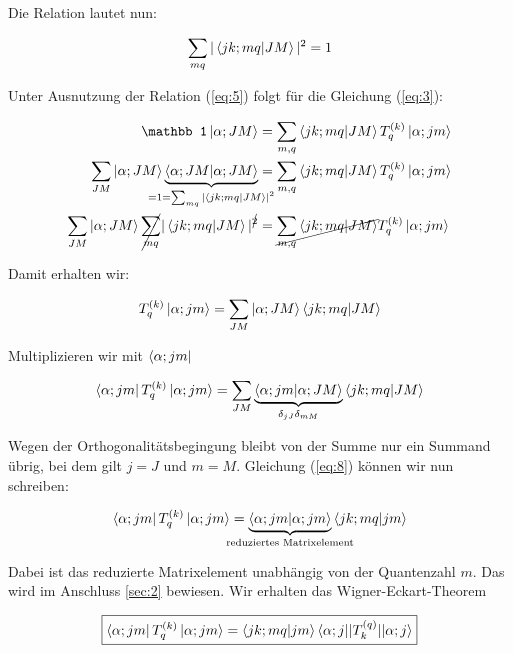 Die Relation lautet nun:

\begin{equation}
  \label{eq:5}
  \sum_{mq}|\braket{jk;mq}{JM} |^2 = 1
\end{equation}

Unter Ausnutzung der Relation (\ref{eq:5}) folgt für die Gleichung (\ref{eq:3}):

\begin{align}
  \label{eq:6}
   \mathbb 1 \ket{\alpha; JM} &=  \sum_{m,q} \braket{jk;mq}{JM} T^{(k)}_q  \ket{\alpha;jm} \\
 \sum_{JM} \ket{\alpha; JM}\underbr{\braket{\alpha; JM}{\alpha; JM}}_{=1=\sum_{mq}|\braket{jk;mq}{JM} |^2} &=  \sum_{m,q} \braket{jk;mq}{JM} T^{(k)}_q  \ket{\alpha;jm} \\
\sum_{JM}\ket{\alpha; JM} \cancel{\sum_{mq}}|\braket{jk;mq}{JM} |^{\cancel 2}   &= \cancel{\sum_{m,q} \braket{jk;mq}{JM}} T^{(k)}_q  \ket{\alpha;jm} 
\end{align}

Damit erhalten wir:

\begin{equation}
  \label{eq:7}
   T^{(k)}_q  \ket{\alpha;jm} = \sum_{JM}\ket{\alpha; JM} \braket{jk;mq}{JM}
\end{equation}

Multiplizieren wir mit \(\left\langle \alpha;jm \right|\)

\begin{equation}
  \label{eq:8}
  \bra{\alpha;jm} T^{(k)}_q  \ket{\alpha;jm} = \sum_{JM} \underbr{\braket{\alpha;jm}{\alpha; JM}}_{\delta_{jJ}\delta_{mM}} \braket{jk;mq}{JM}
\end{equation}

Wegen der Orthogonalitätsbegingung bleibt von der Summe nur ein Summand übrig, bei dem gilt \(j=J\) und \(m=M\). Gleichung (\ref{eq:8}) können wir nun schreiben:

\begin{equation}
  \label{eq:9}
   \bra{\alpha;jm} T^{(k)}_q  \ket{\alpha;jm} = \underbr{\braket{\alpha;jm}{\alpha; jm}}_{\text{reduziertes Matrixelement}}  \braket{jk;mq}{jm}
\end{equation}

Dabei ist das reduzierte Matrixelement unabhängig von der Quantenzahl \(m\). Das wird im Anschluss \ref{sec:2} bewiesen. Wir erhalten das Wigner-Eckart-Theorem

\begin{equation}
  \label{eq:15}
\boxed{\bra{\alpha;jm} T^{(k)}_q  \ket{\alpha;jm} =  \braket{jk;mq}{jm} \langle \alpha;j || T^{(q)}_k || \alpha; j \rangle }
\end{equation}


